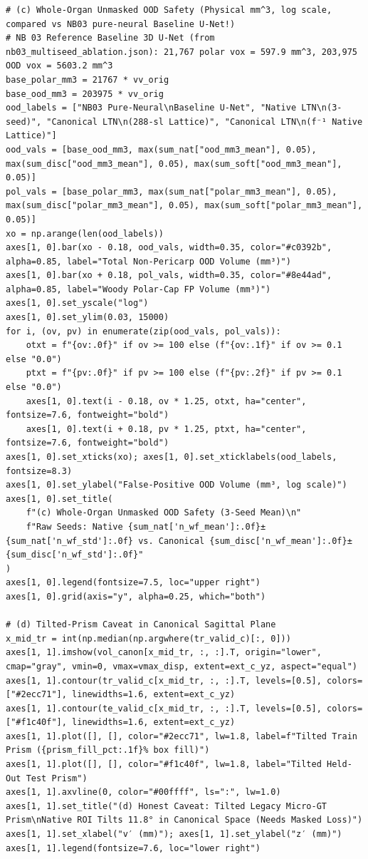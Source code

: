 \documentclass[10pt,a4paper]{article}
\renewcommand{\_}{\origunderscore\allowbreak}
\begin{document}
\begin{codebox}
\begin{lstlisting}[style=pybmed]
# (c) Whole-Organ Unmasked OOD Safety (Physical mm^3, log scale, compared vs NB03 pure-neural Baseline U-Net!)
# NB 03 Reference Baseline 3D U-Net (from nb03_multiseed_ablation.json): 21,767 polar vox = 597.9 mm^3, 203,975 OOD vox = 5603.2 mm^3
base_polar_mm3 = 21767 * vv_orig
base_ood_mm3 = 203975 * vv_orig
ood_labels = ["NB03 Pure-Neural\nBaseline U-Net", "Native LTN\n(3-seed)", "Canonical LTN\n(288-sl Lattice)", "Canonical LTN\n(f⁻¹ Native Lattice)"]
ood_vals = [base_ood_mm3, max(sum_nat["ood_mm3_mean"], 0.05), max(sum_disc["ood_mm3_mean"], 0.05), max(sum_soft["ood_mm3_mean"], 0.05)]
pol_vals = [base_polar_mm3, max(sum_nat["polar_mm3_mean"], 0.05), max(sum_disc["polar_mm3_mean"], 0.05), max(sum_soft["polar_mm3_mean"], 0.05)]
xo = np.arange(len(ood_labels))
axes[1, 0].bar(xo - 0.18, ood_vals, width=0.35, color="#c0392b", alpha=0.85, label="Total Non-Pericarp OOD Volume (mm³)")
axes[1, 0].bar(xo + 0.18, pol_vals, width=0.35, color="#8e44ad", alpha=0.85, label="Woody Polar-Cap FP Volume (mm³)")
axes[1, 0].set_yscale("log")
axes[1, 0].set_ylim(0.03, 15000)
for i, (ov, pv) in enumerate(zip(ood_vals, pol_vals)):
    otxt = f"{ov:.0f}" if ov >= 100 else (f"{ov:.1f}" if ov >= 0.1 else "0.0")
    ptxt = f"{pv:.0f}" if pv >= 100 else (f"{pv:.2f}" if pv >= 0.1 else "0.0")
    axes[1, 0].text(i - 0.18, ov * 1.25, otxt, ha="center", fontsize=7.6, fontweight="bold")
    axes[1, 0].text(i + 0.18, pv * 1.25, ptxt, ha="center", fontsize=7.6, fontweight="bold")
axes[1, 0].set_xticks(xo); axes[1, 0].set_xticklabels(ood_labels, fontsize=8.3)
axes[1, 0].set_ylabel("False-Positive OOD Volume (mm³, log scale)")
axes[1, 0].set_title(
    f"(c) Whole-Organ Unmasked OOD Safety (3-Seed Mean)\n"
    f"Raw Seeds: Native {sum_nat['n_wf_mean']:.0f}±{sum_nat['n_wf_std']:.0f} vs. Canonical {sum_disc['n_wf_mean']:.0f}±{sum_disc['n_wf_std']:.0f}"
)
axes[1, 0].legend(fontsize=7.5, loc="upper right")
axes[1, 0].grid(axis="y", alpha=0.25, which="both")

# (d) Tilted-Prism Caveat in Canonical Sagittal Plane
x_mid_tr = int(np.median(np.argwhere(tr_valid_c)[:, 0]))
axes[1, 1].imshow(vol_canon[x_mid_tr, :, :].T, origin="lower", cmap="gray", vmin=0, vmax=vmax_disp, extent=ext_c_yz, aspect="equal")
axes[1, 1].contour(tr_valid_c[x_mid_tr, :, :].T, levels=[0.5], colors=["#2ecc71"], linewidths=1.6, extent=ext_c_yz)
axes[1, 1].contour(te_valid_c[x_mid_tr, :, :].T, levels=[0.5], colors=["#f1c40f"], linewidths=1.6, extent=ext_c_yz)
axes[1, 1].plot([], [], color="#2ecc71", lw=1.8, label=f"Tilted Train Prism ({prism_fill_pct:.1f}% box fill)")
axes[1, 1].plot([], [], color="#f1c40f", lw=1.8, label="Tilted Held-Out Test Prism")
axes[1, 1].axvline(0, color="#00ffff", ls=":", lw=1.0)
axes[1, 1].set_title("(d) Honest Caveat: Tilted Legacy Micro-GT Prism\nNative ROI Tilts 11.8° in Canonical Space (Needs Masked Loss)")
axes[1, 1].set_xlabel("v′ (mm)"); axes[1, 1].set_ylabel("z′ (mm)")
axes[1, 1].legend(fontsize=7.6, loc="lower right")


\end{lstlisting}
\end{codebox}
\end{document}
